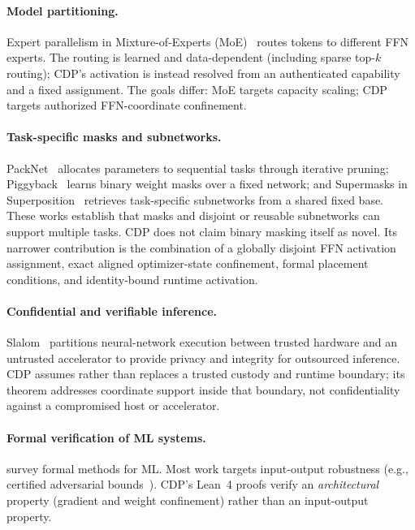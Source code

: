 \documentclass[11pt,a4paper]{article}
\begin{document}
\paragraph{Model partitioning.}
Expert parallelism in Mixture-of-Experts
(MoE)~\citep{fedus2022switch,lepikhin2021gshard} routes tokens
to different FFN experts.  The routing is learned and data-dependent
(including sparse top-$k$ routing); CDP's activation is instead
resolved from an authenticated capability and a fixed assignment.
The goals differ: MoE targets capacity scaling; CDP targets
authorized FFN-coordinate confinement.

\paragraph{Task-specific masks and subnetworks.}
PackNet~\citep{mallya2018packnet} allocates parameters to sequential
tasks through iterative pruning; Piggyback~\citep{mallya2018piggyback}
learns binary weight masks over a fixed network; and Supermasks in
Superposition~\citep{wortsman2020supermasks} retrieves task-specific
subnetworks from a shared fixed base.  These works establish that
masks and disjoint or reusable subnetworks can support multiple tasks.
CDP does not claim binary masking itself as novel.  Its narrower
contribution is the combination of a globally disjoint FFN activation
assignment, exact aligned optimizer-state confinement, formal
placement conditions, and identity-bound runtime activation.

\paragraph{Confidential and verifiable inference.}
Slalom~\citep{tramer2018slalom} partitions neural-network execution
between trusted hardware and an untrusted accelerator to provide
privacy and integrity for outsourced inference.  CDP assumes rather
than replaces a trusted custody and runtime boundary; its theorem
addresses coordinate support inside that boundary, not confidentiality
against a compromised host or accelerator.

\paragraph{Formal verification of ML systems.}
\citet{seshia2018formal} survey formal methods for ML.  Most
work targets input-output robustness (e.g., certified
adversarial bounds~\citep{cohen2019certified}).  CDP's Lean~4
proofs verify an \emph{architectural} property (gradient and
weight confinement) rather than an input-output property.
\end{document}
